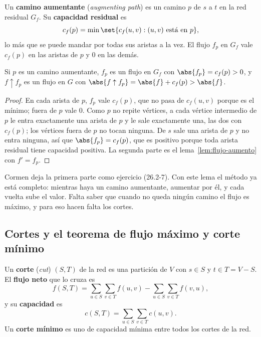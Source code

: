 \documentclass[11pt,letterpaper]{article}
\begin{document}
\begin{definicion}
  Un \textbf{camino aumentante} (\textit{augmenting path}) es un
  camino $p$ de $s$ a $t$ en la red residual $G_f$. Su
  \textbf{capacidad residual} es
  \[
    c_f(p) = \min\set{c_f(u, v) : (u, v) \text{ está en } p} ,
  \]
  lo más que se puede mandar por todas sus aristas a la vez. El flujo
  $f_p$ en $G_f$ vale $c_f(p)$ en las aristas de $p$ y $0$ en las
  demás.
\end{definicion}

\begin{lema}\label{lem:flujo-camino}
  Si $p$ es un camino aumentante, $f_p$ es un flujo en $G_f$ con
  $\abs{f_p} = c_f(p) > 0$, y $f \uparrow f_p$ es un flujo en $G$ con
  $\abs{f \uparrow f_p} = \abs{f} + c_f(p) > \abs{f}$.
\end{lema}

\begin{proof}
  En cada arista de $p$, $f_p$ vale $c_f(p)$, que no pasa de
  $c_f(u, v)$ porque es el mínimo; fuera de $p$ vale $0$. Como $p$ no
  repite vértices, a cada vértice intermedio de $p$ le entra
  exactamente una arista de $p$ y le sale exactamente una, las dos con
  $c_f(p)$; los vértices fuera de $p$ no tocan ninguna. De $s$ sale una
  arista de $p$ y no entra ninguna, así que $\abs{f_p} = c_f(p)$, que
  es positivo porque toda arista residual tiene capacidad positiva. La
  segunda parte es el lema~\ref{lem:flujo-aumento} con $f' = f_p$.
\end{proof}

Cormen deja la primera parte como ejercicio (26.2-7). Con este lema el
método ya está completo: mientras haya un camino aumentante, aumentar
por él, y cada vuelta sube el valor. Falta saber que cuando no queda
ningún camino el flujo es máximo, y para eso hacen falta los cortes.


\subsection*{Cortes y el teorema de flujo máximo y corte mínimo}

\begin{definicion}[Corte]
  Un \textbf{corte} (\textit{cut}) $(S, T)$ de la red es una
  partición de $V$ con $s \in S$ y $t \in T = V - S$. El
  \textbf{flujo neto} que lo cruza es
  \[
    f(S, T) = \sum_{u \in S} \sum_{v \in T} f(u, v)
            - \sum_{u \in S} \sum_{v \in T} f(v, u) ,
  \]
  y su \textbf{capacidad} es
  \[
    c(S, T) = \sum_{u \in S} \sum_{v \in T} c(u, v) .
  \]
  Un \textbf{corte mínimo} es uno de capacidad mínima entre todos los
  cortes de la red.
\end{definicion}
\end{document}
